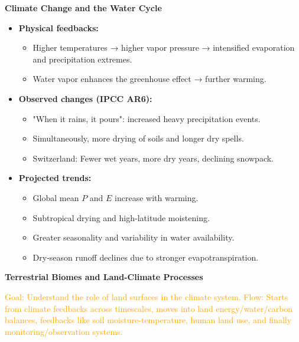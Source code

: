 \documentclass[fontsize=8pt, a4paper, landscape, fleqn]{scrartcl}
\renewcommand{\section}[1]{%
    \noindent\colorbox{sectioncolor}{%
        \parbox{\dimexpr\columnwidth-2\fboxsep}{\color{white}\textbf{#1}}}%
    \vspace{0.5mm}%
}
\renewcommand{\subsection}[1]{%
    \noindent\colorbox{subsectioncolor}{%
        \parbox{\dimexpr\columnwidth-2\fboxsep}{\color{white}\textbf{#1}}}%
    \vspace{0.5mm}%
}
\begin{document}
\begin{multicols*}{3}[\raggedcolumns]
\subsection{Climate Change and the Water Cycle}
\begin{itemize}
    \item \textbf{Physical feedbacks:}
    \begin{itemize}
        \item Higher temperatures → higher vapor pressure → intensified evaporation and precipitation extremes.
        \item Water vapor enhances the greenhouse effect → further warming.
    \end{itemize}
    \item \textbf{Observed changes (IPCC AR6):}
    \begin{itemize}
        \item "When it rains, it pours": increased heavy precipitation events.
        \item Simultaneously, more drying of soils and longer dry spells.
        \item Switzerland: Fewer wet years, more dry years, declining snowpack.
    \end{itemize}
    \item \textbf{Projected trends:}
    \begin{itemize}
        \item Global mean $P$ and $E$ increase with warming.
        \item Subtropical drying and high-latitude moistening.
        \item Greater seasonality and variability in water availability.
        \item Dry-season runoff declines due to stronger evapotranspiration.
    \end{itemize}
\end{itemize}

\section{Terrestrial Biomes and Land-Climate Processes}
\noindent \textcolor{orange}{
Goal: Understand the role of land surfaces in the climate system. Flow: Starts from climate feedbacks across timescales, moves into land energy/water/carbon balances, feedbacks like soil moisture-temperature, human land use, and finally monitoring/observation systems.
}


\end{multicols*}
\end{document}
